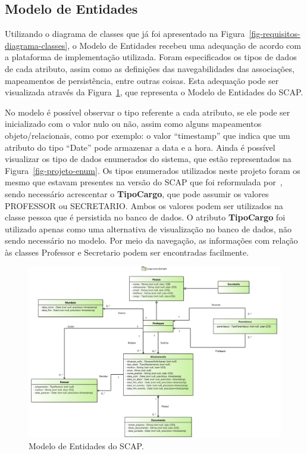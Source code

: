 \FloatBarrier

\subsection{Modelo de Entidades}
\label{sec-projeto-modelo-entidades}

Utilizando o diagrama de classes que já foi apresentado na Figura~\ref{fig-requisitos-diagrama-classes}, o Modelo de Entidades recebeu uma adequação de acordo com a plataforma de implementação utilizada. Foram especificados os tipos de dados de cada atributo, assim como as definições das navegabilidades das associações, mapeamentos de persistência, entre outras coisas. Esta adequação pode ser visualizada através da Figura~\ref{fig-projeto-entidades}, que representa o Modelo de Entidades do SCAP.

No modelo é possível observar o tipo referente a cada atributo, se ele pode ser inicializado com o valor nulo ou não, assim como alguns mapeamentos objeto/relacionais, como por exemplo: o valor ``timestamp'' que indica que um atributo do tipo ``Date'' pode armazenar a data e a hora. Ainda é possível visualizar os tipo de dados enumerados do sistema, que estão representados na Figura~\ref{fig-projeto-enum}. Os tipos enumerados utilizados neste projeto foram os mesmo que estavam presentes na versão do SCAP que foi reformulada por~, sendo necessário acrescentar o \textbf{TipoCargo}, que pode assumir os valores PROFESSOR ou SECRETARIO. Ambos os valores podem ser utilizados na classe pessoa que é persistida no banco de dados. O atributo \textbf{TipoCargo} foi utilizado apenas como uma alternativa de visualização no banco de dados, não sendo necessário no modelo. Por meio da navegação, as informações com relação às classes Professor e Secretario podem ser encontradas facilmente.   

\begin{figure}[!h]
	\centering
	\includegraphics[scale=0.45]{figuras/fig-projeto-entidades} 
	\caption{Modelo de Entidades do SCAP.}
	\label{fig-projeto-entidades}
\end{figure}

